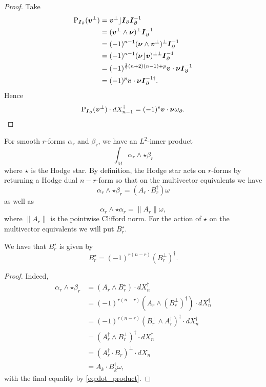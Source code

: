 \begin{proof}
Take
\begin{align*}
\operatorname{P}_{\boldsymbol{I}_\partial}(\boldsymbol{v}^\perp) &= \boldsymbol{v}^\perp \rfloor \boldsymbol{I}_\partial \boldsymbol{I}_\partial^{-1}\\
    &= (\boldsymbol{v}^\perp \wedge \boldsymbol{\nu})^\perp \boldsymbol{I}_\partial^{-1}\\
    &= (-1)^{n-1} (\boldsymbol{\nu} \wedge \boldsymbol{v}^\perp)^\perp \boldsymbol{I}_\partial^{-1}\\
    &= (-1)^{n-1} (\boldsymbol{\nu} \rfloor \boldsymbol{v})^{\perp \perp} \boldsymbol{I}_\partial^{-1}\\
    &= (-1)^{\frac{1}{2}(n+2)(n-1)+p} \boldsymbol{v}\cdot \boldsymbol{\nu} \boldsymbol{I}_\partial^{-1}\\
    &= (-1)^p \boldsymbol{v} \cdot \boldsymbol{\nu} \boldsymbol{I}_\partial^{-1 \dagger}.
\end{align*}
Hence 
\[
\operatorname{P}_{\boldsymbol{I}_\partial}(\boldsymbol{v}^\perp) \cdot dX_{n-1}^\dagger =(-1)^s \boldsymbol{v} \cdot \boldsymbol{\nu} \omega_\partial.
\]
\end{proof}

For smooth $r$-forms $\alpha_r$ and $\beta_r$, we have an $L^2$-inner product 
\begin{equation}
\int_M \alpha_r \wedge \star \beta_r 
\end{equation}
where $\star$ is the Hodge star. By definition, the Hodge star acts on $r$-forms by returning a Hodge dual $n-r$-form so that on the multivector equivalents we have
\begin{equation}
\alpha_r \wedge \star \beta_r  = (A_r\cdot B_r^\dagger)\omega
\end{equation}
as well as
\begin{equation}
    \alpha_r \wedge \star \alpha_r = \|A_r\|\omega,
\end{equation}
where $\|A_r\|$ is the pointwise Clifford norm. For the action of $\star$ on the multivector equivalents we will put $B_r^\star$. 

\begin{proposition}
We have that $B_r^\star$ is given by
\begin{equation}
B_r^\star = (-1)^{r(n-r)}(B_r^\perp)^\dagger.
\end{equation}
\label{prop:multivector_hodge_star}
\end{proposition}
\begin{proof}
Indeed, 
\begin{align*}
    \alpha_r \wedge \star \beta_r &= (A_r \wedge B_r^\star) \cdot dX_n^\dagger\\
    &=(-1)^{r(n-r)} (A_r \wedge (B_r^\perp)^\dagger ) \cdot dX_n^\dagger\\
    &=(-1)^{r(n-r)} (B_r^\perp \wedge A_r^\dagger)^\dagger \cdot dX_n^\dagger\\
    &=(A_r^\dagger \wedge B_r^\perp)^\dagger \cdot dX_n^\dagger\\
    &=(A_r^\dagger \cdot B_r)^\perp \cdot dX_n\\
    &= A_k \cdot B_k^\dagger \omega,
\end{align*}
with the final equality by \cref{eq:dot_product}.
\end{proof}

